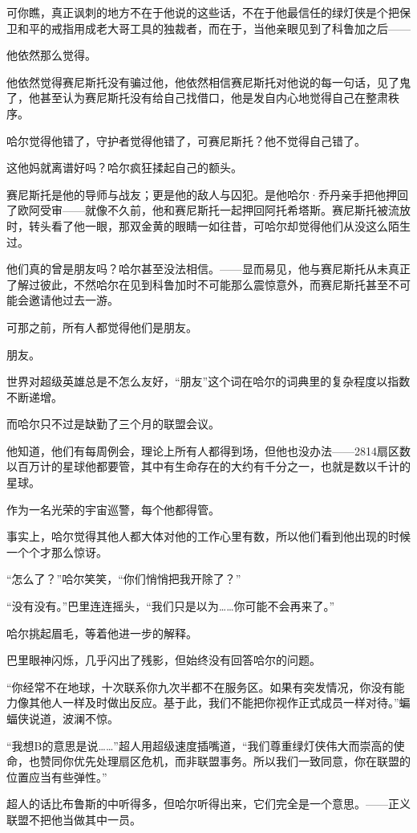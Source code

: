 \documentclass[../main]{subfiles}
\begin{document}
可你瞧，真正讽刺的地方不在于他说的这些话，不在于他最信任的绿灯侠是个把保卫和平的戒指用成老大哥工具的独裁者，而在于，当他亲眼见到了科鲁加之后——

他依然那么觉得。

他依然觉得赛尼斯托没有骗过他，他依然相信赛尼斯托对他说的每一句话，见了鬼了，他甚至认为赛尼斯托没有给自己找借口，他是发自内心地觉得自己在整肃秩序。

哈尔觉得他错了，守护者觉得他错了，可赛尼斯托？他不觉得自己错了。

这他妈就离谱好吗？哈尔疯狂揉起自己的额头。

赛尼斯托是他的导师与战友；更是他的敌人与囚犯。是他哈尔·乔丹亲手把他押回了欧阿受审——就像不久前，他和赛尼斯托一起押回阿托希塔斯。赛尼斯托被流放时，转头看了他一眼，那双金黄的眼睛一如往昔，可哈尔却觉得他们从没这么陌生过。

他们真的曾是朋友吗？哈尔甚至没法相信。——显而易见，他与赛尼斯托从未真正了解过彼此，不然哈尔在见到科鲁加时不可能那么震惊意外，而赛尼斯托甚至不可能会邀请他过去一游。

可那之前，所有人都觉得他们是朋友。

朋友。

世界对超级英雄总是不怎么友好，“朋友”这个词在哈尔的词典里的复杂程度以指数不断递增。

而哈尔只不过是缺勤了三个月的联盟会议。

他知道，他们有每周例会，理论上所有人都得到场，但他也没办法——2814扇区数以百万计的星球他都要管，其中有生命存在的大约有千分之一，也就是数以千计的星球。

作为一名光荣的宇宙巡警，每个他都得管。

事实上，哈尔觉得其他人都大体对他的工作心里有数，所以他们看到他出现的时候一个个才那么惊讶。

“怎么了？”哈尔笑笑，“你们悄悄把我开除了？”

“没有没有。”巴里连连摇头，“我们只是以为……你可能不会再来了。”

哈尔挑起眉毛，等着他进一步的解释。

巴里眼神闪烁，几乎闪出了残影，但始终没有回答哈尔的问题。

“你经常不在地球，十次联系你九次半都不在服务区。如果有突发情况，你没有能力像其他人一样及时做出反应。基于此，我们不能把你视作正式成员一样对待。”蝙蝠侠说道，波澜不惊。

“我想B的意思是说\ldots\ldots”超人用超级速度插嘴道，“我们尊重绿灯侠伟大而崇高的使命，也赞同你优先处理扇区危机，而非联盟事务。所以我们一致同意，你在联盟的位置应当有些弹性。”

超人的话比布鲁斯的中听得多，但哈尔听得出来，它们完全是一个意思。——正义联盟不把他当做其中一员。
\end{document}
